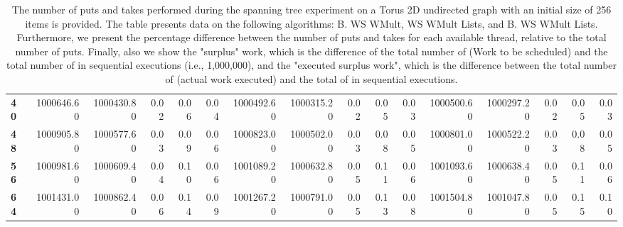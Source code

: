 \begin{table}[!ht]
{\begin{tabular}{lrrrrrrrrrrrrrrr}
\textbf{40} &  1000646.60 & 1000430.80 &           0.02 &        0.06 &                 0.04 &     1000492.60 & 1000315.20 &           0.02 &        0.05 &                 0.03 &        1000500.60 & 1000297.20 &           0.02 &        0.05 &                 0.03 \\
\textbf{48} &  1000905.80 & 1000577.60 &           0.03 &        0.09 &                 0.06 &     1000823.00 & 1000502.00 &           0.03 &        0.08 &                 0.05 &        1000801.00 & 1000522.20 &           0.03 &        0.08 &                 0.05 \\
\textbf{56} &  1000981.60 & 1000609.40 &           0.04 &        0.10 &                 0.06 &     1001089.20 & 1000632.80 &           0.05 &        0.11 &                 0.06 &        1001093.60 & 1000638.40 &           0.05 &        0.11 &                 0.06 \\
\textbf{64} &  1001431.00 & 1000862.40 &           0.06 &        0.14 &                 0.09 &     1001267.20 & 1000791.00 &           0.05 &        0.13 &                 0.08 &        1001504.80 & 1001047.80 &           0.05 &        0.15 &                 0.10 \\
\bottomrule
\end{tabular}}
\label{difference-Torus_2D_undirected-256-B_WS_NC_MULT_OPT-WS_NC_MULT_LA_OPT-B_WS_NC_MULT_LA_OPT}
\caption{The number of puts and takes performed during the
    spanning tree experiment on a Torus 2D undirected graph with an initial size
    of 256 items is provided. The table presents data on the
    following algorithms: B. WS WMult, WS WMult Lists, and
    B. WS WMult Lists. Furthermore, we present the percentage difference
    between the number of puts and takes for each available thread,
    relative to the total number of puts. Finally, also we show the
    "surplus" work, which is the difference of the total number of
    \Puts (Work to be scheduled) and the total number of \Puts in
    sequential executions (i.e., 1,000,000), and the "executed surplus
    work", which is the difference between the total number of \Takes
    (actual work executed) and the total of \Takes in sequential
    executions.}
\end{table}
